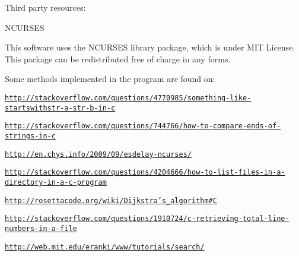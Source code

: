 Third party resources\-:

N\-C\-U\-R\-S\-E\-S

This software uses the N\-C\-U\-R\-S\-E\-S library package, which is under M\-I\-T License. This package can be redistributed free of charge in any forms.

Some methods implemented in the program are found on\-:

\href{http://stackoverflow.com/questions/4770985/something-like-startswithstr-a-str-b-in-c}{\tt http\-://stackoverflow.\-com/questions/4770985/something-\/like-\/startswithstr-\/a-\/str-\/b-\/in-\/c}

\href{http://stackoverflow.com/questions/744766/how-to-compare-ends-of-strings-in-c}{\tt http\-://stackoverflow.\-com/questions/744766/how-\/to-\/compare-\/ends-\/of-\/strings-\/in-\/c}

\href{http://en.chys.info/2009/09/esdelay-ncurses/}{\tt http\-://en.\-chys.\-info/2009/09/esdelay-\/ncurses/}

\href{http://stackoverflow.com/questions/4204666/how-to-list-files-in-a-directory-in-a-c-program}{\tt http\-://stackoverflow.\-com/questions/4204666/how-\/to-\/list-\/files-\/in-\/a-\/directory-\/in-\/a-\/c-\/program}

\href{http://rosettacode.org/wiki/Dijkstra's_algorithm#C}{\tt http\-://rosettacode.\-org/wiki/\-Dijkstra's\-\_\-algorithm\#\-C}

\href{http://stackoverflow.com/questions/1910724/c-retrieving-total-line-numbers-in-a-file}{\tt http\-://stackoverflow.\-com/questions/1910724/c-\/retrieving-\/total-\/line-\/numbers-\/in-\/a-\/file}

\href{http://web.mit.edu/eranki/www/tutorials/search/}{\tt http\-://web.\-mit.\-edu/eranki/www/tutorials/search/} 